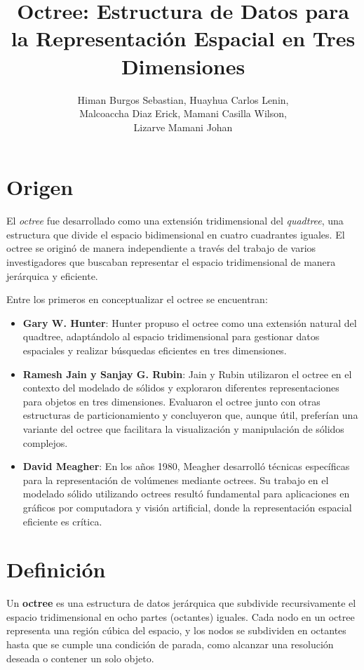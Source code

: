 \documentclass{article}
\title{Octree: Estructura de Datos para la Representación Espacial en Tres Dimensiones}
\author{Himan Burgos Sebastian, Huayhua Carlos Lenin,\\ Malcoaccha Diaz Erick, Mamani Casilla Wilson,\\
Lizarve Mamani Johan }
\date{}
\begin{document}
\maketitle


\section{Origen}
El \textit{octree} fue desarrollado como una extensión tridimensional del \textit{quadtree}, una estructura que divide el espacio bidimensional en cuatro cuadrantes iguales. El octree se originó de manera independiente a través del trabajo de varios investigadores que buscaban representar el espacio tridimensional de manera jerárquica y eficiente. 

Entre los primeros en conceptualizar el octree se encuentran:
\begin{itemize}
    \item \textbf{Gary W. Hunter}: Hunter propuso el octree como una extensión natural del quadtree, adaptándolo al espacio tridimensional para gestionar datos espaciales y realizar búsquedas eficientes en tres dimensiones.
    \item \textbf{Ramesh Jain y Sanjay G. Rubin}: Jain y Rubin utilizaron el octree en el contexto del modelado de sólidos y exploraron diferentes representaciones para objetos en tres dimensiones. Evaluaron el octree junto con otras estructuras de particionamiento y concluyeron que, aunque útil, preferían una variante del octree que facilitara la visualización y manipulación de sólidos complejos.
    \item \textbf{David Meagher}: En los años 1980, Meagher desarrolló técnicas específicas para la representación de volúmenes mediante octrees. Su trabajo en el modelado sólido utilizando octrees resultó fundamental para aplicaciones en gráficos por computadora y visión artificial, donde la representación espacial eficiente es crítica.
\end{itemize}

\section{Definición}
Un \textbf{octree} es una estructura de datos jerárquica que subdivide recursivamente el espacio tridimensional en ocho partes (octantes) iguales. Cada nodo en un octree representa una región cúbica del espacio, y los nodos se subdividen en octantes hasta que se cumple una condición de parada, como alcanzar una resolución deseada o contener un solo objeto.
\end{document}
